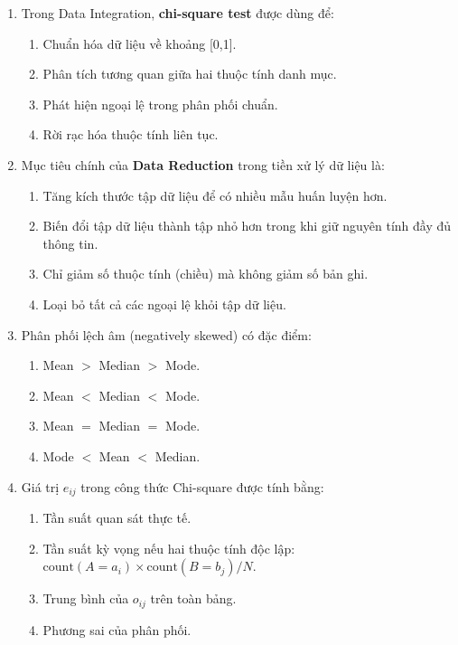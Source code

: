\documentclass[10pt]{article}
\begin{document}
\begin{enumerate}[leftmargin=*, label=\textbf{Câu \arabic*.}]
    \item Trong Data Integration, \textbf{chi-square test} được dùng để:
    \begin{enumerate}[label=\Alph*.]
        \item Chuẩn hóa dữ liệu về khoảng [0,1].
        \item Phân tích tương quan giữa hai thuộc tính danh mục.
        \item Phát hiện ngoại lệ trong phân phối chuẩn.
        \item Rời rạc hóa thuộc tính liên tục.
    \end{enumerate}

    \item Mục tiêu chính của \textbf{Data Reduction} trong tiền xử lý dữ liệu là:
    \begin{enumerate}[label=\Alph*.]
        \item Tăng kích thước tập dữ liệu để có nhiều mẫu huấn luyện hơn.
        \item Biến đổi tập dữ liệu thành tập nhỏ hơn trong khi giữ nguyên tính đầy đủ thông tin.
        \item Chỉ giảm số thuộc tính (chiều) mà không giảm số bản ghi.
        \item Loại bỏ tất cả các ngoại lệ khỏi tập dữ liệu.
    \end{enumerate}

    \item Phân phối lệch âm (negatively skewed) có đặc điểm:
    \begin{enumerate}[label=\Alph*.]
        \item Mean $>$ Median $>$ Mode.
        \item Mean $<$ Median $<$ Mode.
        \item Mean $=$ Median $=$ Mode.
        \item Mode $<$ Mean $<$ Median.
    \end{enumerate}

    \item Giá trị $e_{ij}$ trong công thức Chi-square được tính bằng:
    \begin{enumerate}[label=\Alph*.]
        \item Tần suất quan sát thực tế.
        \item Tần suất kỳ vọng nếu hai thuộc tính độc lập: $\text{count}(A=a_i) \times \text{count}(B=b_j) / N$.
        \item Trung bình của $o_{ij}$ trên toàn bảng.
        \item Phương sai của phân phối.
    \end{enumerate}

\end{enumerate}
\end{document}
